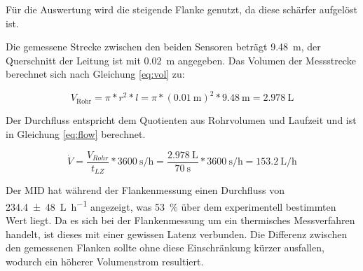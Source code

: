 Für die Auswertung wird die steigende Flanke genutzt, da diese schärfer aufgelöst ist.

Die gemessene Strecke zwischen den beiden Sensoren beträgt \SI{9,48}{\meter}, der Querschnitt der Leitung ist mit \SI{0,02}{\meter} angegeben. Das Volumen der Messstrecke berechnet sich nach Gleichung \ref{eq:vol} zu:

\begin{equation}
	\label{eq:vol}
	V_{\text{Rohr}} = \pi * r^2 * l = \pi * (\SI{0,01}{\meter})^2 * \SI{9,48}{\meter} = \SI{2,978}{\liter}
\end{equation}

Der Durchfluss entspricht dem Quotienten aus Rohrvolumen und Laufzeit und ist in Gleichung \ref{eq:flow} berechnet.

\begin{equation}
	\label{eq:flow}
	\dot V = \frac{V_{Rohr}}{t_{LZ}}*\SI{3600}{\second\per\hour} = \frac{\SI{2,978}{\liter}}{\SI{70}{\second}}*\SI{3600}{\second\per\hour} = \SI{153,2}{\liter\per\hour}
\end{equation}

Der MID hat während der Flankenmessung einen Durchfluss von \SI{234,4(48)}{\liter\per\hour} angezeigt, was \SI{53}{\percent} über dem experimentell bestimmten Wert liegt. Da es sich bei der Flankenmessung um ein thermisches Messverfahren handelt, ist dieses mit einer gewissen Latenz verbunden. Die Differenz zwischen den gemessenen Flanken sollte ohne diese Einschränkung kürzer ausfallen, wodurch ein höherer Volumenstrom resultiert.


